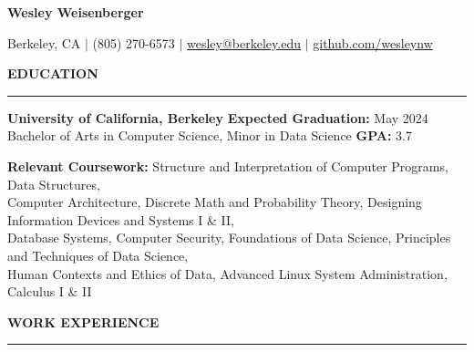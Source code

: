 \documentclass{article}
\begin{document}
    \newcommand{\header}[1]{ 
        \vspace{4mm}
        {\large \noindent \textbf{#1}}
        \vspace{1.5mm}
        \hrule
        \vspace{2mm}
    }

    \begin{center}
        
        {\huge \textbf{Wesley Weisenberger}}
    
        \vspace{2mm}

        {\Large Berkeley, CA  $\mid$ (805) 270-6573 
            $\mid$
            \href{mailto:wesley@berkeley.edu}{wesley@berkeley.edu}
            $\mid$ 
            \href{https://github.com/wesleynw}{github.com/wesleynw}
        }

    \end{center}

    
    \header{EDUCATION}

        \begin{adjustwidth}{1em}{1em}

            \textbf{University of California, Berkeley} 
            \hfill 
            \textbf{Expected Graduation:} May 2024 \\
            Bachelor of Arts in Computer Science, Minor in Data Science \hfill  \textbf{GPA:} 3.7

            \vspace{2.5mm}

            \textbf{Relevant Coursework:}
                Structure and Interpretation of Computer Programs, 
                Data Structures, \\
                Computer Architecture,
                Discrete Math and Probability Theory, 
                Designing Information Devices and Systems I \& II, \\
                Database Systems, 
                Computer Security,
                Foundations of Data Science,
                Principles and Techniques of Data Science, \\
                Human Contexts and Ethics of Data, 
                Advanced Linux System Administration,
                Calculus I \& II

        \end{adjustwidth}

            
    \header{WORK EXPERIENCE}
\end{document}
